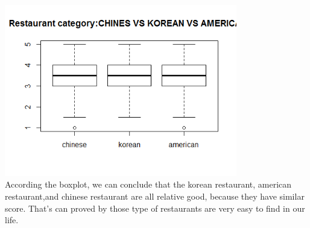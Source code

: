 \documentclass[11pt]{article}
\begin{document}
\begin{enumerate}[(a)]
\includegraphics[width=4in]{multiple.png}\\
According the boxplot, we can conclude that the korean restaurant, american restaurant,and chinese restaurant are all relative good, because they have similar score. That's can proved by those type of restaurants are very easy to find in our life. 
\end{enumerate}
\end{document}
